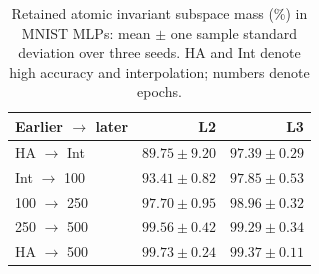 \begin{table}[!htbp]
\centering
\caption{Retained atomic invariant subspace mass (\%) in MNIST MLPs: mean $\pm$ one sample standard deviation over three seeds. HA and Int denote high accuracy and interpolation; numbers denote epochs.}
\label{tab:persistence-main}
\small\setlength{\tabcolsep}{3pt}
\begin{tabular}{lrr}\toprule
Earlier $\to$ later & L2 & L3\\\midrule
HA $\to$ Int & $89.75 \pm 9.20$ & $97.39 \pm 0.29$\\
Int $\to$ 100 & $93.41 \pm 0.82$ & $97.85 \pm 0.53$\\
100 $\to$ 250 & $97.70 \pm 0.95$ & $98.96 \pm 0.32$\\
250 $\to$ 500 & $99.56 \pm 0.42$ & $99.29 \pm 0.34$\\
\midrule
HA $\to$ 500 & $99.73 \pm 0.24$ & $99.37 \pm 0.11$\\
\bottomrule\end{tabular}
\end{table}
